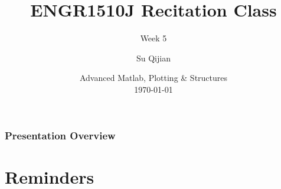 \documentclass[
	11pt, %
]{beamer}
\title[Advanced Matlab, Plotting \& Structures]{ENGR1510J Recitation Class} %
\subtitle{Week 5} %
\author[Su Qijian]{Su Qijian} %
\institute[UM-SJTU JI]{UM-SJTU Joint Institute} %
\date[\today]{Advanced Matlab, Plotting \& Structures \\ \vspace{1cm} \today} %
\begin{document}

\begin{frame}
	\titlepage %
\end{frame}



\begin{frame}
	\frametitle{Presentation Overview} %
	
	\tableofcontents %
\end{frame}


\section{Reminders} %
\end{document}
